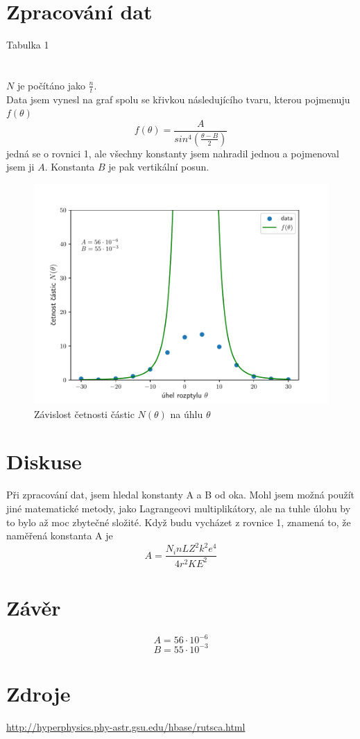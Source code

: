 \documentclass{article}
\begin{document}
\section{Zpracování dat}
\footnotesize{Tabulka 1}\\
\\
\vspace{1em}
\\
$N$ je počítáno jako $\frac{n}{t}$.\\
Data jsem vynesl na graf spolu se křivkou následujícího tvaru, kterou pojmenuju $f(\theta)$
$$f(\theta) = \frac{A}{sin^{4}(\frac{\theta - B}{2})}$$
jedná se o rovnici 1, ale všechny konstanty jsem nahradil jednou a pojmenoval jsem ji $A$.
Konstanta $B$ je pak vertikální posun.
\newpage
\begin{figure}[!h]
  \hspace*{-5em}
  \includegraphics[scale=0.8]{data/graph1.pdf}
  \caption{Závislost četnosti částic $N(\theta)$ na úhlu $\theta$}
\end{figure}
\section{Diskuse}
Při zpracování dat, jsem hledal konstanty A a B od oka.
Mohl jsem možná použít jiné matematické metody, jako Lagrangeovi multiplikátory,
ale na tuhle úlohu by to bylo až moc zbytečné složité.
Když budu vycházet z rovnice 1, znamená to, že naměřená konstanta A je
$$A = \frac{N_{i}n L Z^{2} k^{2} e^{4}}{4 r^{2} K E^{2}}$$
\section{Závěr}
$$A = 56 \cdot 10^{-6}$$
$$B = 55 \cdot 10^{-3}$$
\section{Zdroje}
\url{http://hyperphysics.phy-astr.gsu.edu/hbase/rutsca.html}
\end{document}
